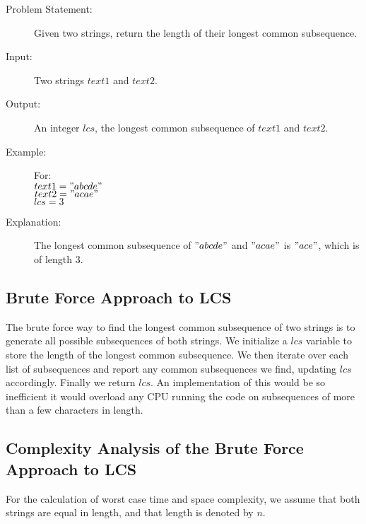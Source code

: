 \begin{description}
    \item[Problem Statement:]
        Given two strings, return the length of their longest common subsequence.

    \item[Input:] 
        Two strings $text1$ and $text2$.
    \item[Output:] 
        An integer $lcs$, the longest common subsequence of $text1$ and $text2$.
        
    \item[Example:] For:\\
        $text1 = "abcde"$\\
        $text2 = "acae"$\\
        $lcs = 3$

    \item[Explanation:]
        The longest common subsequence of $"abcde"$ and $"acae"$ is $"ace"$, which is of length $3$.
   
\end{description}

\subsection{Brute Force Approach to LCS}
The brute force way to find the longest common subsequence of two strings is to generate all possible subsequences of both strings.
We initialize a $lcs$ variable to store the length of the longest common subsequence.
We then iterate over each list of subsequences and report any common subsequences we find, updating $lcs$ accordingly.
Finally we return $lcs$. An implementation of this would be so inefficient it would overload any CPU running the code on subsequences of more than a few characters in length.

\subsection{Complexity Analysis of the Brute Force Approach to LCS}
For the calculation of worst case time and space complexity, we assume that both strings are equal in length, and that length is denoted by $n$.

